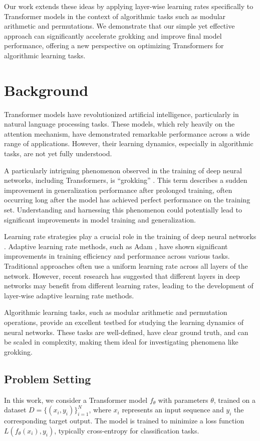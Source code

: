 \documentclass{article} %
\begin{document}
Our work extends these ideas by applying layer-wise learning rates specifically to Transformer models in the context of algorithmic tasks such as modular arithmetic and permutations. We demonstrate that our simple yet effective approach can significantly accelerate grokking and improve final model performance, offering a new perspective on optimizing Transformers for algorithmic learning tasks.

\section{Background}
\label{sec:background}

Transformer models \cite{vaswani2017attention} have revolutionized artificial intelligence, particularly in natural language processing tasks. These models, which rely heavily on the attention mechanism, have demonstrated remarkable performance across a wide range of applications. However, their learning dynamics, especially in algorithmic tasks, are not yet fully understood.

A particularly intriguing phenomenon observed in the training of deep neural networks, including Transformers, is ``grokking'' \cite{power2022grokking}. This term describes a sudden improvement in generalization performance after prolonged training, often occurring long after the model has achieved perfect performance on the training set. Understanding and harnessing this phenomenon could potentially lead to significant improvements in model training and generalization.

Learning rate strategies play a crucial role in the training of deep neural networks \cite{goodfellow2016deep}. Adaptive learning rate methods, such as Adam \cite{kingma2014adam}, have shown significant improvements in training efficiency and performance across various tasks. Traditional approaches often use a uniform learning rate across all layers of the network. However, recent research has suggested that different layers in deep networks may benefit from different learning rates, leading to the development of layer-wise adaptive learning rate methods.

Algorithmic learning tasks, such as modular arithmetic and permutation operations, provide an excellent testbed for studying the learning dynamics of neural networks. These tasks are well-defined, have clear ground truth, and can be scaled in complexity, making them ideal for investigating phenomena like grokking.

\subsection{Problem Setting}
In this work, we consider a Transformer model $f_\theta$ with parameters $\theta$, trained on a dataset $D = \{(x_i, y_i)\}_{i=1}^{N}$, where $x_i$ represents an input sequence and $y_i$ the corresponding target output. The model is trained to minimize a loss function $L(f_\theta(x_i), y_i)$, typically cross-entropy for classification tasks.
\end{document}
